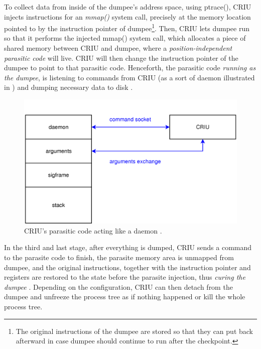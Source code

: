 \documentclass[
  digital,     %
  oneside,     %
  nosansbold,  %
  nocolorbold, %
  lof,         %
  lot,         %
]{fithesis4}
\begin{document}
To collect data from inside of the dumpee's address space, using ptrace(), CRIU injects instructions for an \emph{mmap()} system call, precisely at the memory location pointed to by the instruction pointer of dumpee\footnote{The original instructions of the dumpee are stored so that they can put back afterward in case dumpee should continue to run after the checkpoint.}. Then, CRIU lets dumpee run so that it performs the injected mmap() system call, which allocates a piece of shared memory between CRIU and dumpee, where a \emph{position-independent parasitic code} will live. CRIU will then change the instruction pointer of the dumpee to point to that parasitic code. Henceforth, the parasitic code \emph{running as the dumpee}, is listening to commands from CRIU (as a sort of daemon illustrated in ) and dumping necessary data to disk \cite{criu_parasite}.

\begin{figure}[H]
  \begin{center}
  \includegraphics[width=\textwidth]{figures/criu-parasite-daemon.png}
  \end{center}
  \caption{CRIU's parasitic code acting like a daemon \cite{criu_parasite}.}
  \label{fig:parasite-daemon}
\end{figure}

In the third and last stage, after everything is dumped, CRIU sends a command to the parasite code to finish, the parasite memory area is unmapped from dumpee, and the original instructions, together with the instruction pointer and registers are restored to the state before the parasite injection, thus \emph{curing the dumpee} \cite{criu_parasite}. Depending on the configuration, CRIU can then detach from the dumpee and unfreeze the process tree as if nothing happened or kill the whole process tree.
\end{document}

